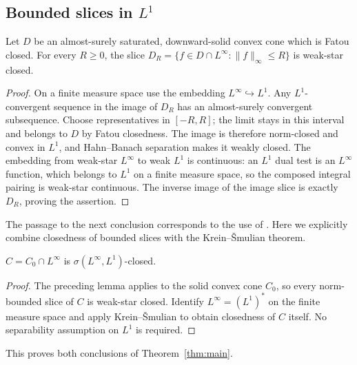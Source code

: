 \subsection{Bounded slices in \texorpdfstring{$L^1$}{L1}}
\begin{lemma}
Let $D$ be an almost-surely saturated, downward-solid convex cone which is
Fatou closed. For every $R\geq0$, the slice
$D_R=\{f\in D\cap L^\infty:\|f\|_\infty\leq R\}$ is weak-star closed.
\end{lemma}
\begin{proof}
On a finite measure space use the embedding $L^\infty\hookrightarrow L^1$.
Any $L^1$-convergent sequence in the image of $D_R$ has an almost-surely
convergent subsequence. Choose representatives in $[-R,R]$; the limit stays
in this interval and belongs to $D$ by Fatou closedness. The image is therefore
norm-closed and convex in $L^1$, and Hahn--Banach separation makes it weakly closed.
The embedding from weak-star $L^\infty$ to weak $L^1$ is continuous: an $L^1$
dual test is an $L^\infty$ function, which belongs to $L^1$ on a finite measure
space, so the composed integral pairing is weak-star continuous. The inverse
image of the image slice is exactly $D_R$, proving the assertion.
\end{proof}
The passage to the next conclusion corresponds to the use of \cite[Theorem 2.1]{DS}. Here we explicitly combine closedness of bounded slices with the Krein--\v Smulian theorem.

\begin{proposition}\label{prop:weakstar}
$C=C_0\cap L^\infty$ is $\sigma(L^\infty,L^1)$-closed.
\end{proposition}
\begin{proof}
The preceding lemma applies to the solid convex cone $C_0$, so every
norm-bounded slice of $C$ is weak-star closed. Identify $L^\infty=(L^1)^*$
on the finite measure space and apply Krein--\v Smulian to obtain closedness
of $C$ itself. No separability assumption on $L^1$ is required.
\end{proof}
This proves both conclusions of Theorem~\ref{thm:main}.

